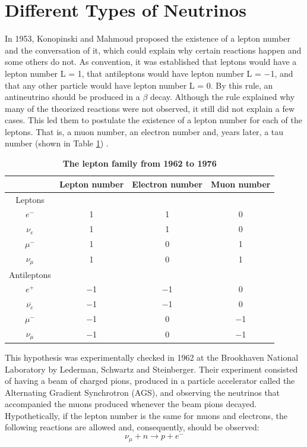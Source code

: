 \section{Different Types of Neutrinos}
In 1953, Konopinski and Mahmoud proposed the existence of a lepton number and the conversation of it, which could explain why certain reactions happen and some others do not. As convention, it was established that leptons would have a lepton number L = 1, that antileptons would have lepton number L = $-$1, and that any other particle would have lepton number L = 0. By this rule, an antineutrino should be produced in a $\beta$ decay. Although the rule explained why many of the theorized reactions were not observed, it still did not explain a few cases. This led them to postulate the existence of a lepton number for each of the leptons. That is, a muon number, an electron number and, years later, a tau number (shown in Table \ref{lepton_family}) \cite{Konopinski_Mahmoud}. 
%
\begin{table}
	\begin{center}
		\begin{tabular}{cccc}
			\bottomrule
						& \textbf{Lepton number}	&	\textbf{Electron number}	&	\textbf{Muon number}\\
			\toprule
			Leptons			&		&		&	 \\
			$e^-$			&	1	&	1	&	0\\ 
			$\nu_e$			&	1	&	1	&	0\\
			$\mu^-$			&	1	&	0	&	1\\	
			$\nu_\mu$		&	1	&	0	&	1\\
			Antileptons		&		&		&	  \\
			$e^+$			&	$-$1	&	$-$1	&	0\\	
			$\overline{\nu_e}$	&	$-$1	&	$-$1	&	0\\
			$\mu^-$			&	$-$1	&	0	&	$-$1\\
			$\nu_\mu$		&	$-$1	&	0	&	$-$1\\
			\toprule
		\end{tabular}
		\caption[The lepton family]{{\textbf{The lepton family from 1962 to 1976}} \cite{griffiths}}
		\label{lepton_family}
	\end{center}
\end{table}
\newline

This hypothesis was experimentally checked in 1962 at the Brookhaven National Laboratory by Lederman, Schwartz and Steinberger. Their experiment consisted of having a beam of charged pions, produced in a particle accelerator called the Alternating Gradient Synchrotron (AGS), and observing the neutrinos that accompanied the muons produced whenever the beam pions decayed. Hypothetically, if the lepton number is the same for muons and electrons, the following reactions are allowed and, consequently, should be observed: 
%
\begin{equation}
	\nu_{\mu} + n \longrightarrow p + e^-
	\label{lss_primeira}
\end{equation}


